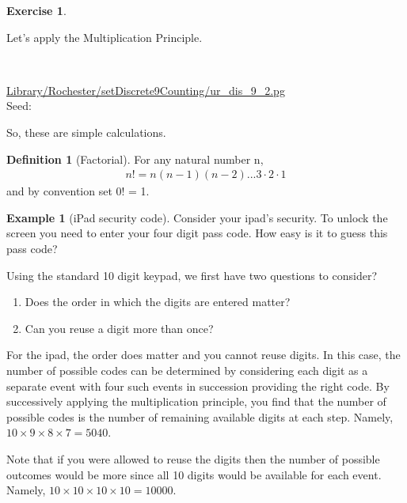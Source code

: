 \documentclass[10pt,]{book}
\theoremstyle{plain}
\theoremstyle{definition}
\newtheorem{definition}[theorem]{Definition}
\theoremstyle{definition}
\newtheorem{example}[theorem]{Example}
\theoremstyle{definition}
\newtheorem{exercise}[theorem]{Exercise}
\numberwithin{equation}{section}
\begin{document}
\begin{exercise}\label{exercise-10}

		Let's apply the Multiplication Principle.
\par\medskip
\mbox{}\\ %
\begin{mdframed}
{}\par\vspace*{2ex}%
{\tiny\ttfamily\noindent\url{Library/Rochester/setDiscrete9Counting/ur_dis_9_2.pg}\\Seed: \hfill}\end{mdframed}
\medskip\noindent 
		So, these are simple calculations.
\par
\end{exercise}
\begin{definition}[{Factorial}]\label{definition-17}
For any natural number n, 
		\begin{gather*}
n! = n(n-1)(n-2) ... 3 \cdot 2 \cdot 1
\end{gather*}
		and by convention set 0! = 1.
\end{definition}
\begin{example}[iPad security code]\label{example-6}
Consider your ipad's security. To unlock the screen you need to enter your four digit pass code. How easy is it to guess this pass code?%
\par
Using the standard 10 digit keypad, we first have two questions to consider?
		\leavevmode%
\begin{enumerate}
\item\hypertarget{li-63}{}Does the order in which the digits are entered matter?%
\item\hypertarget{li-64}{}Can you reuse a digit more than once?%
\end{enumerate}

		For the ipad, the order does matter and you cannot reuse digits. In this case, the number of possible codes can be determined by considering each digit as a separate event with four such events in succession providing the right code. By successively applying the multiplication principle, you find that the number of possible codes is the number of remaining available digits at each step.  Namely, \(10 \times 9 \times 8 \times 7 = 5040.\)
\par

		Note that if you were allowed to reuse the digits then the number of possible outcomes would be more since all 10 digits would be available for each event.  Namely, \(10 \times 10 \times 10 \times 10 = 10000.\)
\end{example}
\end{document}
